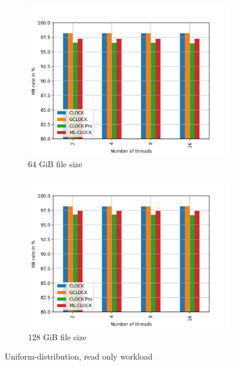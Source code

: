 \documentclass[
	12pt,
	a4paper,
	abstract,
	bibliography=totoc,
	chapterprefix,
	headings=openright,
	numbers=endperiod,
	parskip=half,
	twoside,
]{scrreprt}
\begin{document}
\begin{figure}[H]
\begin{subfigure}{0.4\textwidth}
		\includegraphics[width=\textwidth]{multi_64_gb_randread_uniform.jpg}		
		\caption{64 GiB file size}
		\label{fig:rw_90to10  zoned}
	\end{subfigure}
	\hfill
	\begin{subfigure}{0.4\textwidth}
		\includegraphics[width=\textwidth]{multi_128_gb_randread_uniform.jpg}		
		\caption{128 GiB file size}
		\label{fig:rw_90to10  uniform}
	\end{subfigure}
	\caption{Uniform-distribution, read only workload}
	\label{fig:multi uniform read only}
\end{figure}
\end{document}
